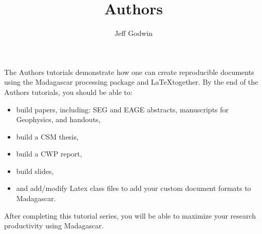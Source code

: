 \title{Authors}
\author{Jeff Godwin}
\maketitle
The Authors tutorials demonstrate how one can create reproducible documents using the Madagascar processing package and \LaTeX together.  By the end of the Authors tutorials, you should be able to:
\begin{itemize}
	\item build papers, including: SEG and EAGE abstracts, manuscripts for Geophysics, and handouts,
	\item build a CSM thesis,
    \item build a CWP report,
    \item build slides,
    \item and add/modify Latex class files to add your custom document formats to Madagascar.
\end{itemize}
After completing this tutorial series, you will be able to maximize your research productivity using Madagascar.


%
%
%
%
%
%
%
